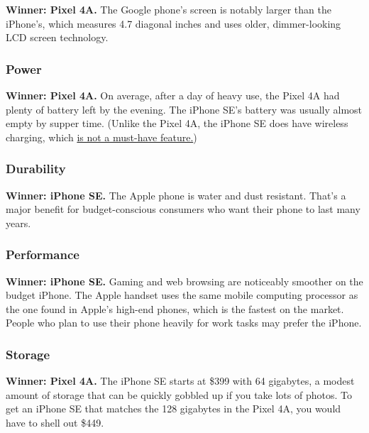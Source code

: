 \textbf{Winner: Pixel 4A.} The Google phone's screen is notably larger
than the iPhone's, which measures 4.7 diagonal inches and uses older,
dimmer-looking LCD screen technology.

\hypertarget{power}{%
\subsubsection{Power}\label{power}}

\textbf{Winner: Pixel 4A.} On average, after a day of heavy use, the
Pixel 4A had plenty of battery left by the evening. The iPhone SE's
battery was usually almost empty by supper time. (Unlike the Pixel 4A,
the iPhone SE does have wireless charging, which
\href{https://www.nytimes3xbfgragh.onion/2018/10/03/technology/personaltech/wireless-charging-pros-cons.html}{is
not a must-have feature.})

\hypertarget{durability}{%
\subsubsection{Durability}\label{durability}}

\textbf{Winner: iPhone SE.} The Apple phone is water and dust resistant.
That's a major benefit for budget-conscious consumers who want their
phone to last many years.

\hypertarget{performance}{%
\subsubsection{Performance}\label{performance}}

\textbf{Winner: iPhone SE.} Gaming and web browsing are noticeably
smoother on the budget iPhone. The Apple handset uses the same mobile
computing processor as the one found in Apple's high-end phones, which
is the fastest on the market. People who plan to use their phone heavily
for work tasks may prefer the iPhone.

\hypertarget{storage}{%
\subsubsection{Storage}\label{storage}}

\textbf{Winner: Pixel 4A.} The iPhone SE starts at \$399 with 64
gigabytes, a modest amount of storage that can be quickly gobbled up if
you take lots of photos. To get an iPhone SE that matches the 128
gigabytes in the Pixel 4A, you would have to shell out \$449.

